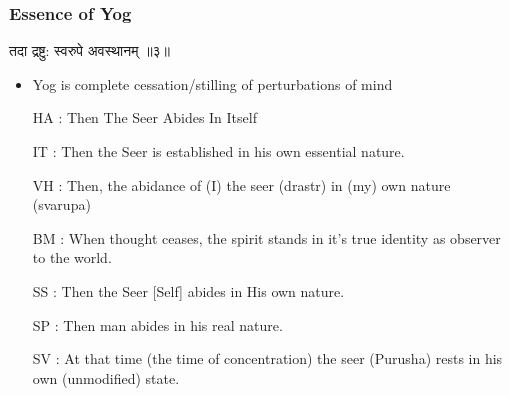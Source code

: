 \begin{frame}[fragile]\frametitle{Essence of Yog}

\begin{sanskrit}
तदा द्रष्टु: स्वरुपे अवस्थानम् ॥३॥
\end{sanskrit}


	\begin{itemize}
	\item Yog is complete cessation/stilling of perturbations of mind
	\item [HA]: Then The Seer Abides In Itself
	\item [IT]: Then the Seer is established in his own essential nature.
	\item [VH]: Then, the abidance of (I) the seer (drastr) in (my) own nature (svarupa)
	\item [BM]: When thought ceases, the spirit stands in it’s true identity as observer to the world.
	\item [SS]: Then the Seer [Self] abides in His own nature.
	\item [SP]: Then man abides in his real nature.
	\item [SV]: At that time (the time of concentration) the seer (Purusha) rests in his own (unmodified) state.	
	\end{itemize}

\end{frame}

